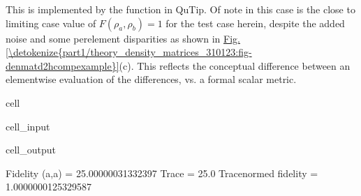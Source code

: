 \documentclass[letterpaper,table,10pt,english]{jupyterBook}
\begin{document}
\sphinxAtStartPar
This is implemented by the  function in QuTip. Of note in this case is the close to limiting case value of \(F(\rho_{a},\rho_{b})=1\) for the test case herein, despite the added noise and some per\sphinxhyphen{}element disparities as shown in   \hyperref[\detokenize{part1/theory_density_matrices_310123:fig-denmatd2hcompexample}]{Fig.\@ \ref{\detokenize{part1/theory_density_matrices_310123:fig-denmatd2hcompexample}}}(c). This reflects the conceptual difference between an element\sphinxhyphen{}wise evaluation of the differences, vs. a formal scalar metric.

\begin{sphinxuseclass}{cell}\begin{sphinxVerbatimInput}

\begin{sphinxuseclass}{cell_input}
\begin{sphinxVerbatim}[commandchars=\\\{\}]
\end{sphinxVerbatim}

\end{sphinxuseclass}\end{sphinxVerbatimInput}
\begin{sphinxVerbatimOutput}

\begin{sphinxuseclass}{cell_output}
\begin{sphinxVerbatim}[commandchars=\\\{\}]
Fidelity (a,a) = 25.00000031332397
Trace = 25.0
Trace\PYGZhy{}normed fidelity = 1.0000000125329587
\end{sphinxVerbatim}

\end{sphinxuseclass}\end{sphinxVerbatimOutput}

\end{sphinxuseclass}
\end{document}
